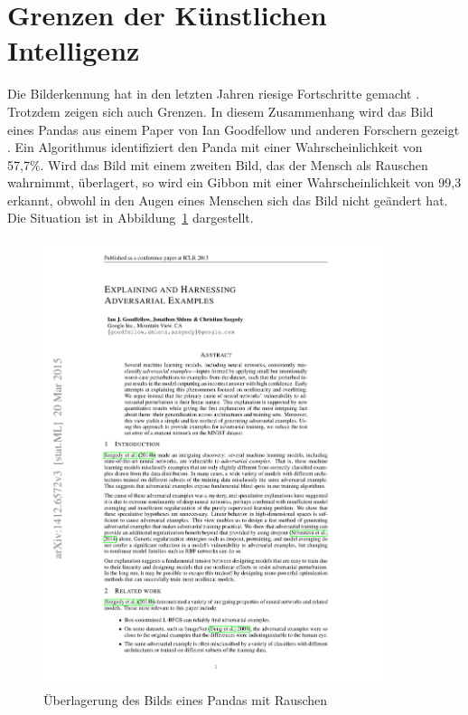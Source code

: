 %
%


\section{Grenzen der Künstlichen Intelligenz}

Die Bilderkennung hat in den letzten Jahren riesige Fortschritte gemacht \cite{}. Trotzdem zeigen sich auch Grenzen. In diesem Zusammenhang wird das Bild eines Pandas aus einem Paper von Ian Goodfellow und anderen Forschern gezeigt \cite{Goodfellow:2014}. Ein Algorithmus identifiziert den Panda mit einer Wahrscheinlichkeit von 57{,}7\%. Wird das Bild mit einem zweiten Bild, das der Mensch als Rauschen wahrnimmt, überlagert, so wird ein Gibbon mit einer Wahrscheinlichkeit von 99{,}3 erkannt, obwohl in den Augen eines Menschen sich das Bild nicht geändert hat. Die Situation ist in Abbildung~\ref{Adversarial:Panda} dargestellt.

\begin{figure}
    \includegraphics[page=3,width=0.9\textwidth,viewport=20 600 560 900,clip]{../../MLbib/Adversarial/1412.6572.pdf}
    
    \caption{Überlagerung des Bilds eines Pandas mit Rauschen  \cite{Goodfellow:2014}}\label{Adversarial:Panda}
\end{figure}

